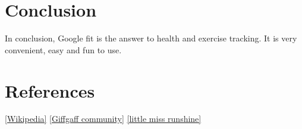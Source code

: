 \documentclass[10pt,a4paper]{report}
\begin{document}
\begin{flushleft}
\begin{itemize}
		\section{Conclusion}
		In conclusion, Google fit is the answer to health and exercise tracking. It is very convenient, easy and fun to use.
		\section{References}
		\ref{Wikipedia} 
		\ref{Giffgaff community}
		\ref{little miss runshine}
		
		 
			  	
			  	\end{itemize}
	\end{flushleft}
\end{document}

